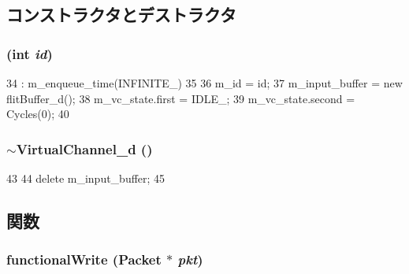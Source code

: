 \subsection{コンストラクタとデストラクタ}
\hypertarget{classVirtualChannel__d_a27059efb5c173261a1ee230ff9f958f9}{
\subsubsection[{VirtualChannel\_\-d}]{ (int {\em id})}}
\label{classVirtualChannel__d_a27059efb5c173261a1ee230ff9f958f9}



\begin{DoxyCode}
34     : m_enqueue_time(INFINITE_)
35 {
36     m_id = id;
37     m_input_buffer = new flitBuffer_d();
38     m_vc_state.first = IDLE_;
39     m_vc_state.second = Cycles(0);
40 }
\end{DoxyCode}
\hypertarget{classVirtualChannel__d_a5d3a84cee64470c16b425f9b2a22f397}{
\subsubsection[{$\sim$VirtualChannel\_\-d}]{\setlength{\rightskip}{0pt plus 5cm}$\sim${\bf VirtualChannel\_\-d} ()}}
\label{classVirtualChannel__d_a5d3a84cee64470c16b425f9b2a22f397}



\begin{DoxyCode}
43 {
44     delete m_input_buffer;
45 }
\end{DoxyCode}


\subsection{関数}
\hypertarget{classVirtualChannel__d_ad07b9def1d6f5e5f988a254c3a9d1ad9}{
\subsubsection[{functionalWrite}]{ functionalWrite ({\bf Packet} $\ast$ {\em pkt})}}
\label{classVirtualChannel__d_ad07b9def1d6f5e5f988a254c3a9d1ad9}



